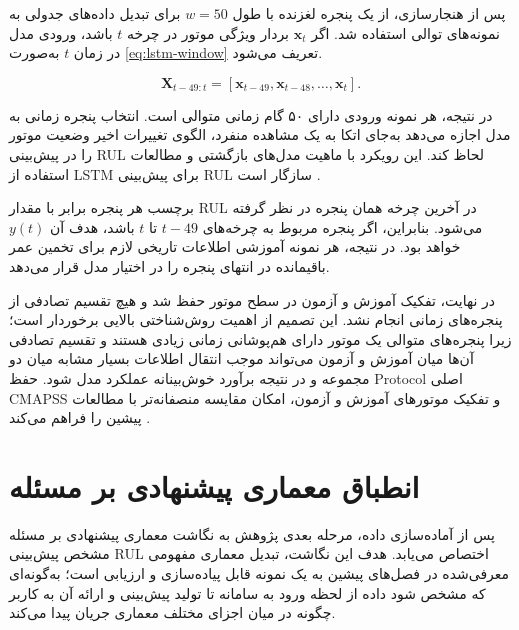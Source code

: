 پس از هنجارسازی، از یک پنجره لغزنده با طول
$w=50$ برای تبدیل داده‌های جدولی به نمونه‌های توالی استفاده شد.
اگر $\mathbf{x}_t$ بردار ویژگی موتور در چرخه $t$ باشد، ورودی مدل
در زمان $t$ به‌صورت 
\ref{eq:lstm-window}
 تعریف می‌شود.

\begin{equation}
	\label{eq:lstm-window}
	\mathbf{X}_{t-49:t}
	=
	[
	\mathbf{x}_{t-49},
	\mathbf{x}_{t-48},
	\ldots,
	\mathbf{x}_{t}
	].
\end{equation}

در نتیجه، هر نمونه ورودی دارای ۵۰ گام زمانی متوالی است. انتخاب
پنجره زمانی به مدل اجازه می‌دهد به‌جای اتکا به یک مشاهده منفرد،
الگوی تغییرات اخیر وضعیت موتور را در پیش‌بینی \gls{RUL} لحاظ کند.
این رویکرد با ماهیت مدل‌های بازگشتی و مطالعات استفاده از LSTM برای
پیش‌بینی \gls{RUL} سازگار است \cite{heimes2008recurrent}.

برچسب هر پنجره برابر با مقدار \gls{RUL} در آخرین چرخه همان پنجره
در نظر گرفته می‌شود. بنابراین، اگر پنجره مربوط به چرخه‌های
$t-49$ تا $t$ باشد، هدف آن $y(t)$ خواهد بود. در نتیجه، هر نمونه
آموزشی اطلاعات تاریخی لازم برای تخمین عمر باقیمانده در انتهای
پنجره را در اختیار مدل قرار می‌دهد.

در نهایت، تفکیک آموزش و آزمون در سطح موتور حفظ شد و هیچ تقسیم
تصادفی از پنجره‌های زمانی انجام نشد. این تصمیم از اهمیت
روش‌شناختی بالایی برخوردار است؛ زیرا پنجره‌های متوالی یک موتور
دارای هم‌پوشانی زمانی زیادی هستند و تقسیم تصادفی آن‌ها میان
آموزش و آزمون می‌تواند موجب انتقال اطلاعات بسیار مشابه میان دو
مجموعه و در نتیجه برآورد خوش‌بینانه عملکرد مدل شود. حفظ \gls{Protocol}
اصلی \gls{CMAPSS} و تفکیک موتورهای آموزش و آزمون، امکان مقایسه منصفانه‌تر
با مطالعات پیشین را فراهم می‌کند \cite{NASA2007C-MAPSS}.





\section{انطباق معماری پیشنهادی بر مسئله }
\label{sec:arch-cmapss}

پس از آماده‌سازی داده، مرحله بعدی پژوهش به نگاشت معماری پیشنهادی
بر مسئله مشخص پیش‌بینی \gls{RUL} اختصاص می‌یابد. هدف این نگاشت،
تبدیل معماری مفهومی معرفی‌شده در فصل‌های پیشین به یک نمونه قابل
پیاده‌سازی و ارزیابی است؛ به‌گونه‌ای که مشخص شود داده از لحظه ورود
به سامانه تا تولید پیش‌بینی و ارائه آن به کاربر چگونه در میان
اجزای مختلف معماری جریان پیدا می‌کند.

